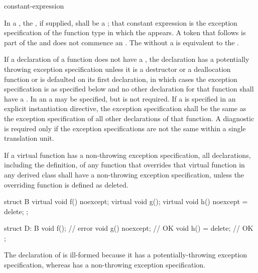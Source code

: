 \begin{bnf}
\br
     \terminal{(} constant-expression \terminal{)}\br
    \br
\end{bnf}

\pnum
{}%
In a , the ,
if supplied, shall be a
;
that constant expression is the exception specification of
the function type in which the  appears.
A \tcode{(} token that follows  is part of the
 and does not commence an
.
The  
without a 
is
equivalent to the 
.

\pnum
If a declaration of a function
does not have a ,
the declaration has a potentially throwing exception specification
unless it is a destructor or a deallocation function
or is defaulted on its first declaration,
in which cases the exception specification
is as specified below
and no other declaration for that function
shall have a .
In an 
a  may be specified,
but is not required.
If a  is specified
in an explicit instantiation directive,
the exception specification shall be the same as
the exception specification of all other declarations of that function.
A diagnostic is required only if the
exception specifications are not the same
within a single translation unit.

\pnum
{}%
If a virtual function has a
non-throwing exception specification,
all declarations, including the definition, of any function
that overrides that virtual function in any derived class
shall have a non-throwing
exception specification,
unless the overriding function is defined as deleted.
\begin{example}
\begin{codeblock}
struct B {
  virtual void f() noexcept;
  virtual void g();
  virtual void h() noexcept = delete;
};

struct D: B {
  void f();                     // error
  void g() noexcept;            // OK
  void h() = delete;            // OK
};
\end{codeblock}

The declaration of
is ill-formed because it
has a potentially-throwing exception specification,
whereas
has a non-throwing exception specification.
\end{example}

